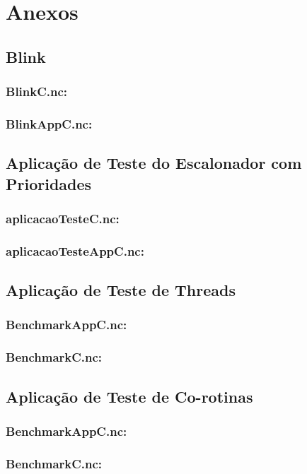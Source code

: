 \documentclass[a4paper, 10pt]{article}
\begin{document}
\section{Anexos}
\subsection{Blink}\label{a:Blink}
\subsubsection{BlinkC.nc:}


\subsubsection{BlinkAppC.nc:}


\subsection{Aplicação de Teste do Escalonador com Prioridades}\label{a:appTeste}
\subsubsection{aplicacaoTesteC.nc:}


\subsubsection{aplicacaoTesteAppC.nc:}


\subsection{Aplicação de Teste de Threads}\label{a:appTesteThread}
\subsubsection{BenchmarkAppC.nc:}


\subsubsection{BenchmarkC.nc:}


\subsection{Aplicação de Teste de Co-rotinas}\label{a:appTesteCoro}
\subsubsection{BenchmarkAppC.nc:}


\subsubsection{BenchmarkC.nc:}




\end{document}
